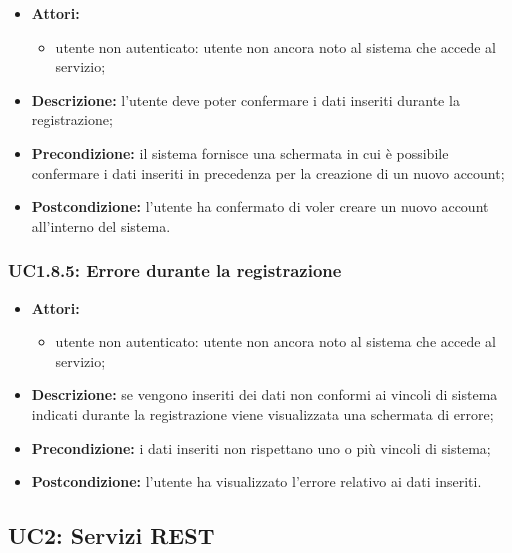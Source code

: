 \begin{itemize}
	\item \textbf{Attori:}
	\begin{itemize}
		\item utente non autenticato: utente non ancora noto al sistema che accede al servizio;
	\end{itemize}
	\item \textbf{Descrizione:} l'utente deve poter confermare i dati inseriti durante la registrazione;
	\item \textbf{Precondizione:} il sistema fornisce una schermata in cui è possibile confermare i dati inseriti in precedenza per la creazione di un nuovo account;
	\item \textbf{Postcondizione:} l'utente ha confermato di voler creare un nuovo account all'interno
	del sistema.
\end{itemize}

\subsubsection{UC1.8.5: Errore durante la registrazione}

\begin{itemize}
	\item \textbf{Attori:}
	\begin{itemize}
		\item utente non autenticato: utente non ancora noto al sistema che accede al servizio;
	\end{itemize}
	\item \textbf{Descrizione:} se vengono inseriti dei dati non conformi ai vincoli di sistema indicati durante la registrazione viene visualizzata una schermata di errore;
	\item \textbf{Precondizione:} i dati inseriti non rispettano uno o più vincoli di sistema;
	\item \textbf{Postcondizione:} l'utente ha visualizzato l'errore relativo ai dati inseriti.
\end{itemize}

\pagebreak

%
%
%
%
%
%
%
%

\subsection{UC2: Servizi REST}


